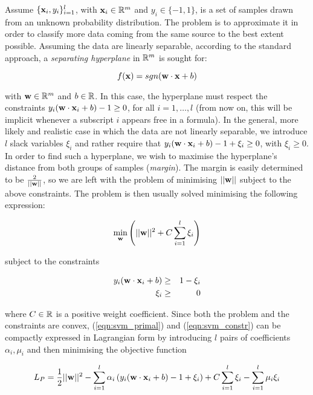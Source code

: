 Assume $\{\mathbf{x}_i,y_i\}_{i=1}^l$, with $\mathbf{x}_i \in \mathbb{R}^m$ and $y_i \in
\{-1,1\}$, is a set of samples drawn from an unknown probability
distribution. The problem is to approximate it in order to classify
more data coming from the same source to the best extent
possible. Assuming the data are linearly separable, according to the
standard approach, a \emph{separating hyperplane} in $\mathbb{R}^m$ is sought
for:

\begin{equation} \label{eqn:dec}
  f(\mathbf{x}) = sgn(\mathbf{w}\cdot\mathbf{x} + b)
\end{equation}

\noindent with $\mathbf{w} \in \mathbb{R}^m$ and $b \in \mathbb{R}$. In this case, the
hyperplane must respect the constraints $y_i(\mathbf{w}\cdot\mathbf{x}_i + b)-1\geq
0$, for all $i = 1,\ldots,l$ (from now on, this will be implicit
whenever a subscript $i$ appears free in a formula). In the general,
more likely and realistic case in which the data are not linearly
separable, we introduce $l$ slack variables $\xi_i$ and rather require
that $y_i(\mathbf{w}\cdot\mathbf{x}_i + b)-1+\xi_i\geq 0$, with $\xi_i \geq 0$. In
order to find such a hyperplane, we wish to maximise the hyperplane's
distance from both groups of samples (\emph{margin}). The margin is
easily determined to be $\frac{2}{||\mathbf{w}||}$, so we are left with the
problem of minimising $||\mathbf{w}||$ subject to the above constraints. The
problem is then usually solved minimising the following expression:

\begin{equation} \label{eqn:svm_primal}
  \min_{\mathbf{w}} \left( ||\mathbf{w}||^2 + C \sum_{i=1}^l \xi_i \right)
\end{equation}

\noindent subject to the constraints

\begin{eqnarray} \label{eqn:svm_constr}
  y_i (\mathbf{w}\cdot\mathbf{x}_i + b) & \geq & 1-\xi_i \\
                    \xi_i & \geq & 0 \nonumber
\end{eqnarray}

\noindent where $C \in \mathbb{R}$ is a positive weight coefficient. Since
both the problem and the constraints are convex,
(\ref{eqn:svm_primal}) and (\ref{eqn:svm_constr}) can be compactly
expressed in Lagrangian form by introducing $l$ pairs of coefficients
$\alpha_i, \mu_i$ and then minimising the objective function

\begin{equation} \label{eqn:lp1}
  L_P =
      \frac{1}{2} ||\mathbf{w}||^2
    - \sum_{i=1}^l \alpha_i \left(y_i (\mathbf{w}\cdot\mathbf{x}_i+b) - 1 + \xi_i \right)
    + C \sum_{i=1}^l \xi_i
    - \sum_{i=1}^l \mu_i \xi_i
\end{equation}

